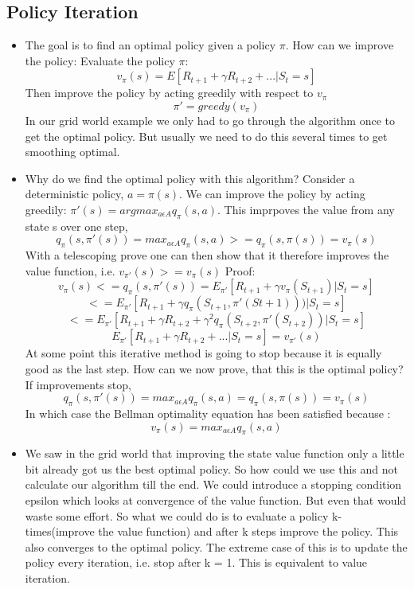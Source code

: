 \documentclass[a4paper]{article}
\begin{document}
\subsection{Policy Iteration}
\begin{itemize}
    \item The goal is to find an optimal policy given a policy $\pi$. How can we improve the policy: 
    \newline
    Evaluate the policy $\pi$:
    $$v_{\pi}(s) = E[R_{t+1} + \gamma R_{t+2}+ ...| S_t = s]$$
    Then improve the policy by acting greedily with respect to $v_{\pi}$
    $$\pi' = greedy(v_{\pi})$$
    In our grid world example we only had to go through the algorithm once to get the optimal policy. But usually we need to do this several times to get smoothing optimal. 
    \item Why do we find the optimal policy with this algorithm? Consider a deterministic policy, $a = \pi(s)$. We can improve the policy by acting greedily: $ \pi'(s) = argmax_{a \epsilon A} q_{\pi}(s,a)$. This imprpoves the value from any state s over one step, $$q_{\pi}(s,\pi'(s)) = max_{a \epsilon A} q_{\pi}(s,a) >= q_{\pi}(s,\pi(s)) = v_{\pi}(s)$$
    With a telescoping prove one can then show that it therefore improves the value function, i.e. $ v_{\pi'}(s) >= v_{\pi}(s)$
    Proof: 
    $$v_{\pi}(s) <= q_{\pi}(s, \pi'(s)) = E_{\pi'}[R_{t+1} + \gamma v_{\pi}(S_{t+1})| S_t = s ]$$
    $$<= E_{\pi'}[R_{t+1} + \gamma q_{\pi}(S_{t+1}, \pi'(S{t+1})))| S_t = s ] $$
    $$<=E_{\pi'}[R_{t+1} + \gamma R_{t+2} + \gamma^2 q_{\pi}(S_{t+2}, \pi'(S_{t+2}))| S_t = s]$$
    $$E_{\pi'}[R_{t+1} + \gamma R_{t+2} + ... |S_t =s] = v_{\pi'}(s)$$
    \newline
    At some point this iterative method is going to stop because it is equally good as the last step. How can we now prove, that this is the optimal policy? 
    If improvements stop, 
    $$q_{\pi}(s, \pi'(s)) = max_{a\epsilon A} q_{\pi}(s,a) = q_{\pi}(s, \pi(s)) = v_{\pi}(s)$$
    In which case the Bellman optimality equation has been satisfied because : $$v_{\pi}(s) = max_{a \epsilon A} q_{\pi}(s,a)$$
    \item We saw in the grid world that improving the state value function only a little bit already got us the best optimal policy. So how could we use this and not calculate our algorithm till the end. We could introduce a stopping condition epsilon which looks at convergence of the value function. But even that would waste some effort. So what we could do is to evaluate a policy k-times(improve the value function) and after k steps improve the policy. This also converges to the optimal policy. 
    The extreme case of this is to update the policy every iteration, i.e. stop after k = 1. This is equivalent to value iteration.  
\end{itemize}
\end{document}
